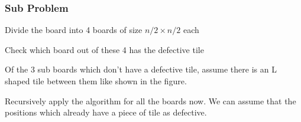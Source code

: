 \documentclass[12pt]{article}
\begin{document}
\subsubsection{Sub Problem}

\begin{enums}[label={(\arabic*)}, noitemsep]
    \item Divide the board into 4 boards of size $n/2 \times n/2$ each
    \item Check which board out of these 4 has the defective tile
    \item Of the 3 sub boards which don't have a defective tile, assume there is an L shaped tile between them like shown in the figure.  
    \item Recursively apply the algorithm for all the boards now. We can assume that the positions which already have a piece of tile as defective.
\end{enums}
\end{document}
